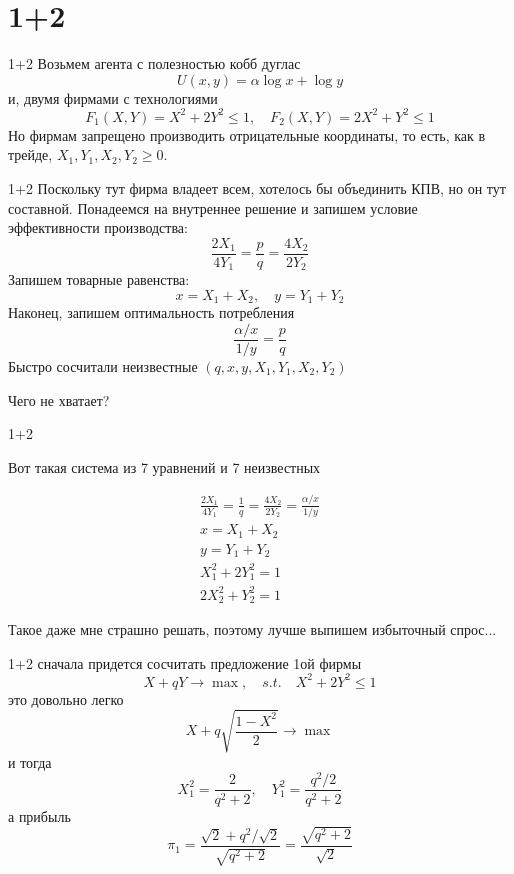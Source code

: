 \documentclass{beamer}
\begin{document}
\section{1+2}

\begin{frame}{1+2}
Возьмем агента с полезностью кобб дуглас
$$ U(x,y) = \alpha \log x + \log y$$
и, двумя фирмами с технологиями
$$ F_{1}(X,Y) = X^2 + 2Y^2 \leqslant 1, \quad F_{2}(X,Y) = 2 X^2 + Y^2 \leqslant 1$$
Но фирмам запрещено производить отрицательные координаты, то есть, как в трейде, $X_{1}, Y_{1}, X_{2}, Y_{2} \geqslant 0$.
\end{frame}

\begin{frame}{1+2}
Поскольку тут фирма владеет всем, хотелось бы объединить КПВ, но он тут составной. Понадеемся на внутреннее решение и запишем условие эффективности производства:
$$ \frac{2X_1}{4Y_1} = \frac{p}{q}= \frac{4 X_2}{2 Y_2}$$
Запишем товарные равенства:
$$ x = X_1 + X_2, \quad y = Y_1 + Y_2$$
Наконец, запишем оптимальность потребления
$$ \frac{\alpha/x}{1/y} = \frac{p}{q}$$
Быстро сосчитали неизвестные $(q, x, y, X_1, Y_1, X_2, Y_2)$

Чего не хватает?
\end{frame}

\begin{frame}{1+2}

Вот такая система из 7 уравнений и 7 неизвестных

\begin{gather*}
	\frac{2X_1}{4Y_1} = \frac{1}{q}= \frac{4 X_2}{2 Y_2} = \frac{\alpha/x}{1/y}\\
	x = X_1 + X_2\\
	y = Y_1 + Y_2\\
	X_1^2 + 2Y_1^2 = 1\\
	2 X_2^2 + Y_2^2 = 1
\end{gather*}

Такое даже мне страшно решать, поэтому лучше выпишем избыточный спрос...

\end{frame}

\begin{frame}{1+2}
сначала придется сосчитать предложение 1ой фирмы
$$ X + q Y \to \max, \quad s.t. \quad X^2 + 2 Y^2 \leqslant 1$$
это довольно легко
$$ X + q \sqrt{\frac{1-X^2}{2}} \to \max$$
и тогда
$$ X^2_1 = \frac{2}{q^2 + 2}, \quad Y_1^2 = \frac{q^2/2}{q^2 + 2}$$
а прибыль
$$ \pi_1 = \frac{\sqrt{2} + q^2/\sqrt{2}}{\sqrt{q^2 + 2}} = \frac{\sqrt{q^2 + 2}}{\sqrt{2}}$$
\end{frame}
\end{document}
